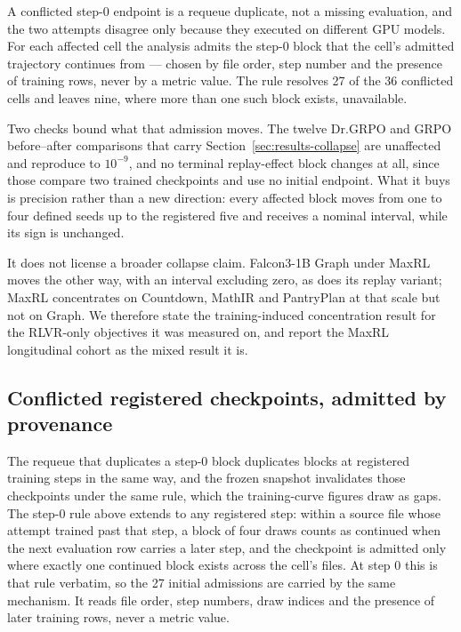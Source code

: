 \documentclass{article}
\newcommand{\1}{\mathbf 1}
\theoremstyle{remark}
\theoremstyle{definition}
\theoremstyle{plain}
\begin{document}
A conflicted step-0 endpoint is a requeue duplicate, not a missing evaluation,
and the two attempts disagree only because they executed on different GPU
models. For each affected cell the analysis admits the step-0 block that the
cell's admitted trajectory continues from --- chosen by file order, step number
and the presence of training rows, never by a metric value. The rule resolves
27 of the 36 conflicted cells and leaves nine, where more than one such block
exists, unavailable.

Two checks bound what that admission moves. The twelve Dr.GRPO and GRPO
before--after comparisons that carry Section~\ref{sec:results-collapse} are
unaffected and reproduce to $10^{-9}$, and no terminal replay-effect block
changes at all, since those compare two trained checkpoints and use no initial
endpoint. What it buys is precision rather than a new direction: every affected
block moves from one to four defined seeds up to the registered five and
receives a nominal interval, while its sign is unchanged.

It does not license a broader collapse claim. Falcon3-1B Graph under MaxRL
moves the other way, with an interval excluding zero, as does its replay
variant; MaxRL concentrates on Countdown, MathIR and PantryPlan at that scale
but not on Graph. We therefore state the training-induced concentration result
for the RLVR-only objectives it was measured on, and report the MaxRL
longitudinal cohort as the mixed result it is.

\subsection{Conflicted registered checkpoints, admitted by provenance}
\label{app:registered-provenance}

The requeue that duplicates a step-0 block duplicates blocks at registered
training steps in the same way, and the frozen snapshot invalidates those
checkpoints under the same rule, which the training-curve figures draw as gaps.
The step-0 rule above extends to any registered step: within a source file
whose attempt trained past that step, a block of four draws counts as continued
when the next evaluation row carries a later step, and the checkpoint is
admitted only where exactly one continued block exists across the cell's files.
At step 0 this is that rule verbatim, so the 27 initial admissions are carried
by the same mechanism. It reads file order, step numbers, draw indices and the
presence of later training rows, never a metric value.
\end{document}
